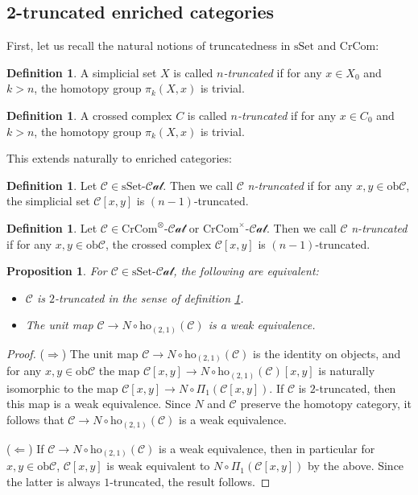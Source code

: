 \documentclass[12pt]{article}
\newtheorem{proposition}[theorem]{Proposition}
\theoremstyle{definition}
\newtheorem{definition}[theorem]{Definition}
\newcommand{\C}{\mathcal{C}}
\newcommand{\sset}{\text{sSet}}
\newcommand{\crcom}{\text{CrCom}}
\newcommand{\cartcrossedcat}{\crcom^\times\text{-}\mathcal{Cat}}
\newcommand{\tensorcrossedcat}{\crcom^\otimes\text{-}\mathcal{Cat}}
\newcommand{\ssetcat}{\text{sSet}\text{-}\mathcal{Cat}}
\newcommand{\ob}{\text{ob}}
\newcommand{\ho}{\text{ho}}
\newcommand{\hotwo}{\ho_{(2,1)}}
\begin{document}
\subsection{2-truncated enriched categories}	
	First, let us recall the natural notions of truncatedness in $\sset$ and $\crcom$:
	\begin{definition}
		A simplicial set $X$ is called \emph{$n$-truncated} if for any $x \in X_0$ and $k >n$, the homotopy group $\pi_k(X,x)$ is trivial.
	\end{definition}
	\begin{definition}
		A crossed complex $C$ is called \emph{$n$-truncated} if for any $x \in C_0$ and $k >n$, the homotopy group $\pi_k(X,x)$ is trivial. 
	\end{definition}
	This extends naturally to enriched categories:
	\begin{definition}\label{dfn:n-truncated-ssetcat}
		Let $\C \in \ssetcat$. Then we call $\C$ \emph{n-truncated} if for any $x,y \in \ob \C$, the simplicial set $\C[x,y]$ is $(n-1)$-truncated.
	\end{definition}
	\begin{definition}\label{dfn:n-truncated-crossedcat}
		Let $\C \in \tensorcrossedcat$ or $\cartcrossedcat$. Then we call $\C$ \emph{n-truncated} if for any $x,y \in \ob \C$, the crossed complex $\C[x,y]$ is $(n-1)$-truncated.
	\end{definition}
	\begin{proposition}\label{prop:2-truncated-equivalent-sset}
		For $\C \in \ssetcat$, the following are equivalent:
		\begin{itemize}
			\item $\C$ is $2$-truncated in the sense of definition \ref{dfn:n-truncated-ssetcat}.
			\item The unit map $\C \to N \circ \hotwo(\C)$ is a weak equivalence.
		\end{itemize}
	\end{proposition}
	\begin{proof}
		($\Rightarrow$) The unit map $\C \to N \circ \hotwo(\C)$ is the identity on objects, and for any $x,y \in \ob\C$ the map $\C[x,y] \to N \circ \hotwo(\C)[x,y]$ is naturally isomorphic to the map $\C[x,y] \to N \circ \Pi_1(\C[x,y])$. If $\C$ is $2$-truncated, then this map is a weak equivalence. Since $N$ and $\C$ preserve the homotopy category, it follows that $\C \to N \circ \hotwo(\C)$ is a weak equivalence. 
		\par ($\Leftarrow$) If $\C \to N \circ \hotwo(\C)$ is a weak equivalence, then in particular for $x,y \in \ob\C$, $\C[x,y]$ is weak equivalent to $N \circ \Pi_1(\C[x,y])$ by the above. Since the latter is always $1$-truncated, the result follows.
	\end{proof}
\end{document}
